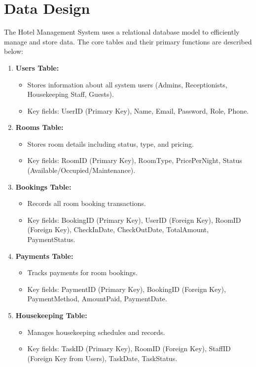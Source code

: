 \documentclass[a4paper,12pt]{article}
\begin{document}
\section{Data Design}
The Hotel Management System uses a relational database model to efficiently manage and store data. The core tables and their primary functions are described below:

\begin{enumerate}
    \item \textbf{Users Table:}
    \begin{itemize}
        \item Stores information about all system users (Admins, Receptionists, Housekeeping Staff, Guests).
        \item Key fields: UserID (Primary Key), Name, Email, Password, Role, Phone.
    \end{itemize}

    \item \textbf{Rooms Table:}
    \begin{itemize}
        \item Stores room details including status, type, and pricing.
        \item Key fields: RoomID (Primary Key), RoomType, PricePerNight, Status (Available/Occupied/Maintenance).
    \end{itemize}

    \item \textbf{Bookings Table:}
    \begin{itemize}
        \item Records all room booking transactions.
        \item Key fields: BookingID (Primary Key), UserID (Foreign Key), RoomID (Foreign Key), CheckInDate, CheckOutDate, TotalAmount, PaymentStatus.
    \end{itemize}

    \item \textbf{Payments Table:}
    \begin{itemize}
        \item Tracks payments for room bookings.
        \item Key fields: PaymentID (Primary Key), BookingID (Foreign Key), PaymentMethod, AmountPaid, PaymentDate.
    \end{itemize}

    \item \textbf{Housekeeping Table:}
    \begin{itemize}
        \item Manages housekeeping schedules and records.
        \item Key fields: TaskID (Primary Key), RoomID (Foreign Key), StaffID (Foreign Key from Users), TaskDate, TaskStatus.
    \end{itemize}
\end{enumerate}
\end{document}
